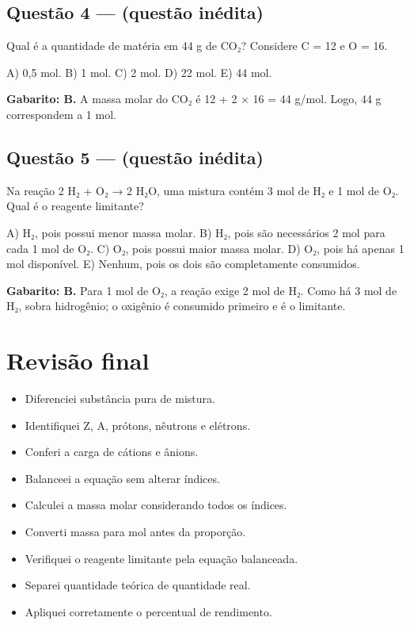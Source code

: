 \documentclass[11pt,a4paper]{article}
\begin{document}
\subsection*{Questão 4 — (questão inédita)}

Qual é a quantidade de matéria em 44 g de CO₂? Considere C = 12 e O = 16.

A) 0,5 mol. B) 1 mol. C) 2 mol. D) 22 mol. E) 44 mol.

\begin{alerta}
\textbf{Gabarito: B.} A massa molar do CO₂ é 12 + 2 × 16 = 44 g/mol. Logo, 44 g correspondem a 1 mol.
\end{alerta}

\subsection*{Questão 5 — (questão inédita)}

Na reação 2 H₂ + O₂ → 2 H₂O, uma mistura contém 3 mol de H₂ e 1 mol de O₂. Qual é o reagente limitante?

A) H₂, pois possui menor massa molar. B) H₂, pois são necessários 2 mol para cada 1 mol de O₂. C) O₂, pois possui maior massa molar. D) O₂, pois há apenas 1 mol disponível. E) Nenhum, pois os dois são completamente consumidos.

\begin{alerta}
\textbf{Gabarito: B.} Para 1 mol de O₂, a reação exige 2 mol de H₂. Como há 3 mol de H₂, sobra hidrogênio; o oxigênio é consumido primeiro e é o limitante.
\end{alerta}

\section*{Revisão final}

\begin{itemize}
  \item[$\square$] Diferenciei substância pura de mistura.
  \item[$\square$] Identifiquei Z, A, prótons, nêutrons e elétrons.
  \item[$\square$] Conferi a carga de cátions e ânions.
  \item[$\square$] Balanceei a equação sem alterar índices.
  \item[$\square$] Calculei a massa molar considerando todos os índices.
  \item[$\square$] Converti massa para mol antes da proporção.
  \item[$\square$] Verifiquei o reagente limitante pela equação balanceada.
  \item[$\square$] Separei quantidade teórica de quantidade real.
  \item[$\square$] Apliquei corretamente o percentual de rendimento.
\end{itemize}
\end{document}
